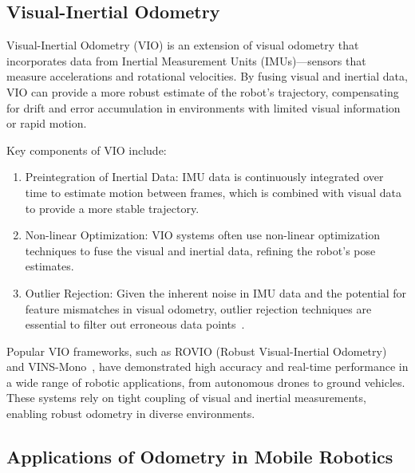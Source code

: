 \subsection{Visual-Inertial Odometry}

Visual-Inertial Odometry (VIO) is an extension of visual odometry that incorporates data from Inertial Measurement Units (IMUs)—sensors that measure accelerations and rotational velocities. By fusing visual and inertial data, VIO can provide a more robust estimate of the robot's trajectory, compensating for drift and error accumulation in environments with limited visual information or rapid motion.

Key components of VIO include:
\begin{enumerate}
    \item Preintegration of Inertial Data: IMU data is continuously integrated over time to estimate motion between frames, which is combined with visual data to provide a more stable trajectory.
    \item Non-linear Optimization: VIO systems often use non-linear optimization techniques to fuse the visual and inertial data, refining the robot’s pose estimates.
    \item Outlier Rejection: Given the inherent noise in IMU data and the potential for feature mismatches in visual odometry, outlier rejection techniques are essential to filter out erroneous data points~\cite{VIO}.
\end{enumerate}

Popular VIO frameworks, such as ROVIO (Robust Visual-Inertial Odometry)~\cite{robust_VIO} and VINS-Mono~\cite{vins_mono}, have demonstrated high accuracy and real-time performance in a wide range of robotic applications, from autonomous drones to ground vehicles. These systems rely on tight coupling of visual and inertial measurements, enabling robust odometry in diverse environments.

\subsection{Applications of Odometry in Mobile Robotics}

